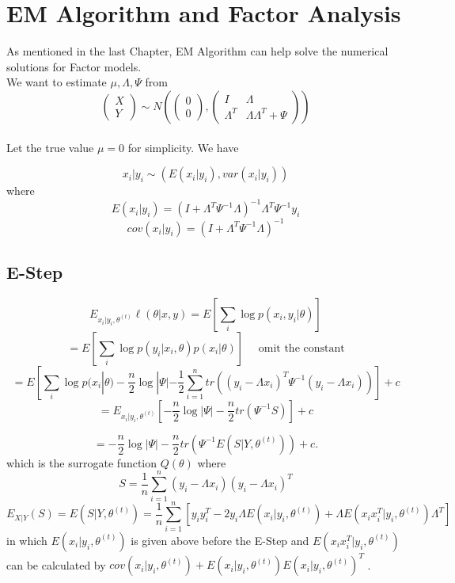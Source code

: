 \documentclass[12pt]{book}
\theoremstyle{definition}
\theoremstyle{remark}
\begin{document}
\section{EM Algorithm and Factor Analysis}
As mentioned in the last Chapter, EM Algorithm can help solve the numerical solutions for Factor models.\\
We want to estimate $\mu, \Lambda, \Psi$ from \[\begin{pmatrix}
 X\\
Y
\end{pmatrix}\sim N(\begin{pmatrix}
 0\\
0
\end{pmatrix}, \begin{pmatrix}
 I & \Lambda\\
 \Lambda^T &\Lambda\Lambda^T+\Psi\end{pmatrix})\]
 \\
 
Let the true value $\mu = 0$ for simplicity. We have

\[x_i|y_i \sim (E(x_i|y_i), var(x_i|y_i))\] 
where 
\[E(x_i|y_i) = (I+\Lambda^T\Psi^{-1}\Lambda)^{-1}\Lambda^T\Psi^{-1}y_i\]
\[cov(x_i|y_i) = (I+\Lambda^T\Psi^{-1}\Lambda)^{-1}\]

\subsection*{E-Step}
\[
E_{x_i | y_i, \theta^{(t)}} \ell(\theta|x,y) = E \left[ \sum_{i} \log p(x_i, y_i | \theta) \right]
\]
\[
= E \left[ \sum_{i} \log p(y_i | x_i, \theta) p(x_i | \theta) \right]\quad \text{ omit the constant}
\]
\[
= E \left[ \sum_{i} \log p(x_i | \theta) - \frac{n}{2} \log | \Psi | - \frac{1}{2} \sum_{i=1}^ntr \left( (y_i - \Lambda x_i)^T \Psi^{-1} (y_i - \Lambda x_i) \right) \right] + c
\]
\[
= E_{x_i | y_i, \theta^{(t)}} \left[- \frac{n}{2} \log | \Psi | - \frac{n}{2} tr \left( \Psi^{-1}S\right)\right] + c
\]

\[
= -\frac{n}{2} \log | \Psi | - \frac{n}{2} tr \left( \Psi^{-1} E (S | Y, \theta^{(t)}) \right) + c.
\]
which is the surrogate function $Q(\theta)$ where
\[
 S = \frac{1}{n}\sum_{i=1}^n (y_i - \Lambda x_i)(y_i - \Lambda x_i)^T
\]
\[
E_{X | Y} (S) = E (S| Y, \theta^{(t)})  =  \frac{1}{n} \sum_{i=1}^n \left[y_iy_i^T - 2y_i \Lambda E (x_i | y_i, \theta^{(t)}) + \Lambda E (x_i x_i^T | y_i, \theta^{(t)})\Lambda^T\right]
\]
in which $E (x_i| y_i, \theta^{(t)})$ is given above before the E-Step and $E (x_i x_i^T | y_i, \theta^{(t)})$ can be calculated by $cov(x_i| y_i, \theta^{(t)}) + E (x_i| y_i, \theta^{(t)})E (x_i| y_i, \theta^{(t)})^T$ .
\end{document}

